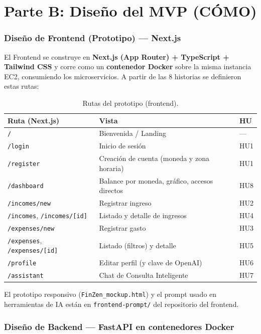 \documentclass[12pt,letterpaper]{article}
\begin{document}
\clearpage
\part*{Parte B: Dise\~no del MVP (C\'OMO)}

\section{Dise\~no de Frontend (Prototipo) --- Next.js}

El Frontend se construye en \textbf{Next.js (App Router) + TypeScript + Tailwind
CSS} y corre como un \textbf{contenedor Docker} sobre la misma instancia EC2,
consumiendo los microservicios. A partir de las 8 historias se definieron estas
rutas:

\begin{table}[H]
\centering
\small
\begin{tabular}{l l l}
\toprule
\textbf{Ruta (Next.js)} & \textbf{Vista} & \textbf{HU} \\
\midrule
\texttt{/} & Bienvenida / Landing & --- \\
\texttt{/login} & Inicio de sesi\'on & HU1 \\
\texttt{/register} & Creaci\'on de cuenta (moneda y zona horaria) & HU1 \\
\texttt{/dashboard} & Balance por moneda, gr\'afico, accesos directos & HU8 \\
\texttt{/incomes/new} & Registrar ingreso & HU2 \\
\texttt{/incomes}, \texttt{/incomes/[id]} & Listado y detalle de ingresos & HU4 \\
\texttt{/expenses/new} & Registrar gasto & HU3 \\
\texttt{/expenses}, \texttt{/expenses/[id]} & Listado (filtros) y detalle & HU5 \\
\texttt{/profile} & Editar perfil (y clave de OpenAI) & HU6 \\
\texttt{/assistant} & Chat de Consulta Inteligente & HU7 \\
\bottomrule
\end{tabular}
\caption{Rutas del prototipo (frontend).}
\end{table}

El prototipo responsivo (\texttt{FinZen\_mockup.html}) y el prompt usado en
herramientas de IA est\'an en \texttt{frontend-prompt/} del repositorio del frontend.

\section{Dise\~no de Backend --- FastAPI en contenedores Docker}
\end{document}
